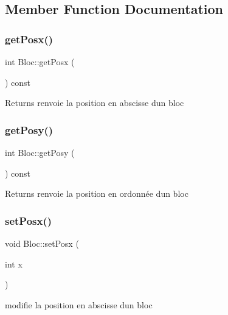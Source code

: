\subsection{Member Function Documentation}
\mbox{\label{classBloc_a1600764b66f921e77cb5ca8d2946a3e2}} 
\subsubsection{\texorpdfstring{get\+Posx()}{getPosx()}}
{\footnotesize\ttfamily int Bloc\+::get\+Posx (\begin{DoxyParamCaption}{ }\end{DoxyParamCaption}) const}

\begin{DoxyReturn}{Returns}
renvoie la position en abscisse d\textquotesingle{}un bloc 
\end{DoxyReturn}
\mbox{\label{classBloc_a362522a2a75cefdbba44a544cd7f1a75}} 
\subsubsection{\texorpdfstring{get\+Posy()}{getPosy()}}
{\footnotesize\ttfamily int Bloc\+::get\+Posy (\begin{DoxyParamCaption}{ }\end{DoxyParamCaption}) const}

\begin{DoxyReturn}{Returns}
renvoie la position en ordonnée d\textquotesingle{}un bloc 
\end{DoxyReturn}
\mbox{\label{classBloc_a2d50fb680c5b8d3d3de2566a125d25a2}} 
\subsubsection{\texorpdfstring{set\+Posx()}{setPosx()}}
{\footnotesize\ttfamily void Bloc\+::set\+Posx (\begin{DoxyParamCaption}\item[{int}]{x }\end{DoxyParamCaption})}



modifie la position en abscisse d\textquotesingle{}un bloc 


